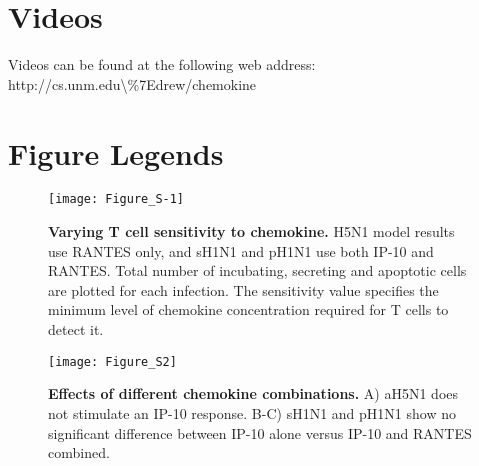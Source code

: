 \documentclass[preprint,10pt,authoryear]{article}
\begin{document}
\section*{Videos}

Videos can be found at the following web address: http://cs.unm.edu\textbackslash\%7Edrew/chemokine




\pagebreak

\section*{Figure Legends}



\setcounter{figure}{0}
\renewcommand{\thefigure}{S\arabic{figure}}


\begin{figure}[!ht]
\begin{center}
 \texttt{[image: Figure\_S-1]}
 \end{center}
\caption{{\bf Varying T cell sensitivity to chemokine.}  H5N1 model results use RANTES  only, and sH1N1 and pH1N1 use both IP-10 and RANTES. Total number of incubating, secreting and apoptotic cells are plotted for each infection.  The sensitivity value specifies the minimum level of chemokine concentration required for T cells to detect it. } 
 \label{fig:sensitivity}
\end{figure}


\begin{figure}[ht!]
\begin{center}
	\texttt{[image: Figure\_S2]}
	\caption{\textbf{Effects of different chemokine combinations.}  A) aH5N1 does not stimulate an IP-10 response.  B-C) sH1N1 and pH1N1 show no significant difference between IP-10 alone versus IP-10 and RANTES combined.}
	\label{fig:chemokine}
\end{center}
\end{figure}
\end{document}
